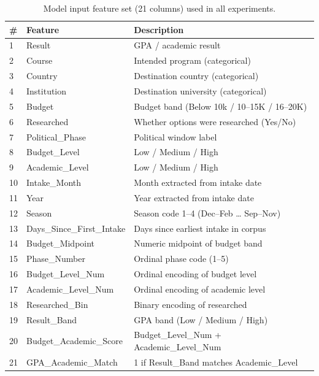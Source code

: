 \begin{table}[htbp]
\centering
\caption{Model input feature set (21 columns) used in all experiments.}
\label{tab:feature_set}
\begin{tabular}{llp{7.2cm}}
\toprule
\textbf{\#} & \textbf{Feature} & \textbf{Description} \\
\midrule
1 & Result & GPA / academic result \\
2 & Course & Intended program (categorical) \\
3 & Country & Destination country (categorical) \\
4 & Institution & Destination university (categorical) \\
5 & Budget & Budget band (Below 10k / 10--15K / 16--20K) \\
6 & Researched & Whether options were researched (Yes/No) \\
7 & Political\_Phase & Political window label \\
8 & Budget\_Level & Low / Medium / High \\
9 & Academic\_Level & Low / Medium / High \\
10 & Intake\_Month & Month extracted from intake date \\
11 & Year & Year extracted from intake date \\
12 & Season & Season code 1--4 (Dec--Feb \ldots{} Sep--Nov) \\
13 & Days\_Since\_First\_Intake & Days since earliest intake in corpus \\
14 & Budget\_Midpoint & Numeric midpoint of budget band \\
15 & Phase\_Number & Ordinal phase code (1--5) \\
16 & Budget\_Level\_Num & Ordinal encoding of budget level \\
17 & Academic\_Level\_Num & Ordinal encoding of academic level \\
18 & Researched\_Bin & Binary encoding of researched \\
19 & Result\_Band & GPA band (Low / Medium / High) \\
20 & Budget\_Academic\_Score & Budget\_Level\_Num + Academic\_Level\_Num \\
21 & GPA\_Academic\_Match & 1 if Result\_Band matches Academic\_Level \\
\bottomrule
\end{tabular}
\end{table}


